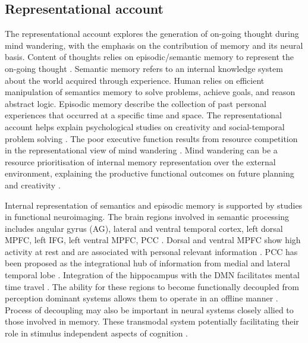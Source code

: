 \subsection{Representational account}

The representational account explores the generation of on-going thought during mind wandering, with the emphasis on the contribution of memory and its neural basis. Content of thoughts relies on episodic/semantic memory to represent the on-going thought \cite{Binder2009,Gusnard2001}. Semantic memory refers to an internal knowledge system about the world acquired through experience. Human relies on efficient manipulation of semantics memory to solve problems, achieve goals, and reason abstract logic. Episodic memory describe the collection of past personal experiences that occurred at a specific time and space. The representational account helps explain psychological studies on creativity \cite{Baird2012,Smeekens2016} and social-temporal problem solving \cite{RubyPlos2013,PoerioFrontiers2016,Medea2016}. The poor executive function results from resource competition in the representational view of mind wandering \cite{SmallwoodSchooler2006}. Mind wandering can be a resource prioritisation of internal memory representation over the external environment, explaining the productive functional outcomes on future planning \cite{Baird2011} and creativity \cite{Baird2012}. 

Internal representation of semantics and episodic memory is supported by studies in functional neuroimaging. The brain regions involved in semantic processing includes angular gyrus (AG), lateral and ventral temporal cortex, left dorsal MPFC, left IFG, left ventral MPFC, PCC \cite<see meta-analysis from >{Binder2009}. Dorsal and ventral MPFC show high activity at rest and are associated with personal relevant information \cite{Gusnard2001}. PCC has been proposed as the integrational hub of information from medial and lateral temporal lobe \cite{Smallwood2016}.  Integration of the hippocampus with the DMN facilitates mental time travel \cite{Karapanagiotidis2017}. The ability for these regions to become functionally decoupled from perception dominant systems allows them to operate in an offline manner \cite{Smallwood2013,Schooler2011}. Process of decoupling may also be important in neural systems closely allied to those involved in memory. These transmodal system potentially facilitating their role in stimulus independent aspects of cognition \cite{Buckner2013,Margulies2016,Mesulam1998}.

